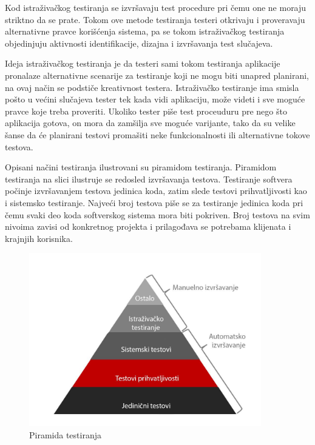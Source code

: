 \documentclass[12pt,oneside]{memoir}
\begin{document}
Kod istraživačkog testiranja se izvršavaju test procedure pri čemu one ne moraju striktno da se prate. Tokom ove metode testiranja testeri otkrivaju i proveravaju alternativne pravce korišćenja sistema, pa se tokom istraživačkog testiranja objedinjuju aktivnosti identifikacije, dizajna i izvršavanja test slučajeva.
\par
Ideja istraživačkog testiranja je da testeri sami tokom testiranja aplikacije pronalaze alternativne scenarije za testiranje koji ne mogu biti unapred planirani, na ovaj način se podstiče kreativnost testera. Istraživačko testiranje ima smisla pošto u većini slučajeva tester tek kada vidi aplikaciju, može videti i sve moguće pravce koje treba proveriti. Ukoliko tester piše test proceuduru pre nego što aplikacija gotova, on mora da zamšilja sve moguće varijante, tako da su velike šanse da će planirani testovi promašiti neke funkcionalnosti ili alternativne tokove testova.
\par 
Opisani načini testiranja ilustrovani su piramidom testiranja. Piramidom testiranja na slici ilustruje se redosled izvršavanja testova. Testiranje softvera počinje izvršavanjem testova jedinica koda, zatim slede testovi prihvatljivosti kao i sistemsko testiranje. Najveći broj testova piše se za testiranje jedinica koda pri čemu svaki deo koda softverskog sistema mora biti pokriven. Broj testova na svim nivoima zavisi od konkretnog projekta i prilagođava se potrebama klijenata i krajnjih korisnika.
\begin{figure}[!ht]\label{slika1}
  \centering
  \includegraphics[width=0.9\textwidth]{piramida.jpg}
  \caption{Piramida testiranja}
  \label{fig:piramida}
\end{figure}
\end{document}
